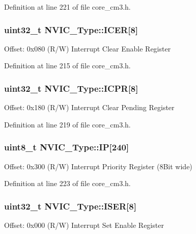 \-Definition at line 221 of file core\-\_\-cm3.\-h.

\hypertarget{struct_n_v_i_c___type_a1965a2e68b61d2e2009621f6949211a5}{
\subsubsection[{\-I\-C\-E\-R}]{ uint32\-\_\-t {\bf \-N\-V\-I\-C\-\_\-\-Type\-::\-I\-C\-E\-R}\mbox{[}8\mbox{]}}}\label{struct_n_v_i_c___type_a1965a2e68b61d2e2009621f6949211a5}
\-Offset\-: 0x080 (\-R/\-W) \-Interrupt \-Clear \-Enable \-Register 

\-Definition at line 215 of file core\-\_\-cm3.\-h.

\hypertarget{struct_n_v_i_c___type_a46241be64208436d35c9a4f8552575c5}{
\subsubsection[{\-I\-C\-P\-R}]{ uint32\-\_\-t {\bf \-N\-V\-I\-C\-\_\-\-Type\-::\-I\-C\-P\-R}\mbox{[}8\mbox{]}}}\label{struct_n_v_i_c___type_a46241be64208436d35c9a4f8552575c5}
\-Offset\-: 0x180 (\-R/\-W) \-Interrupt \-Clear \-Pending \-Register 

\-Definition at line 219 of file core\-\_\-cm3.\-h.

\hypertarget{struct_n_v_i_c___type_a6524789fedb94623822c3e0a47f3d06c}{
\subsubsection[{\-I\-P}]{ uint8\-\_\-t {\bf \-N\-V\-I\-C\-\_\-\-Type\-::\-I\-P}\mbox{[}240\mbox{]}}}\label{struct_n_v_i_c___type_a6524789fedb94623822c3e0a47f3d06c}
\-Offset\-: 0x300 (\-R/\-W) \-Interrupt \-Priority \-Register (8\-Bit wide) 

\-Definition at line 223 of file core\-\_\-cm3.\-h.

\hypertarget{struct_n_v_i_c___type_af90c80b7c2b48e248780b3781e0df80f}{
\subsubsection[{\-I\-S\-E\-R}]{ uint32\-\_\-t {\bf \-N\-V\-I\-C\-\_\-\-Type\-::\-I\-S\-E\-R}\mbox{[}8\mbox{]}}}\label{struct_n_v_i_c___type_af90c80b7c2b48e248780b3781e0df80f}
\-Offset\-: 0x000 (\-R/\-W) \-Interrupt \-Set \-Enable \-Register 


